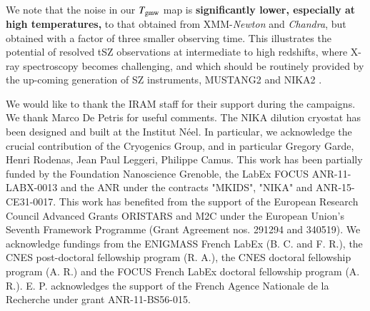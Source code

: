 \documentclass[twocolumn,traditabstract]{aa}
\begin{document}
We note that the noise in our $T_{\rm gmw}$ map is {\bf significantly lower, especially at high temperatures,} to that obtained from XMM-\textit{Newton} and \textit{Chandra}, but obtained with a factor of three smaller observing time. This illustrates the potential of resolved tSZ observations at intermediate to high redshifts, where X-ray spectroscopy becomes challenging, and which should be routinely provided by the up-coming generation of SZ instruments, MUSTANG2 \citep{Dicker2014} and NIKA2 \citep{Calvo2016,Comis2016}.

\begin{acknowledgements}
We would like to thank the IRAM staff for their support during the campaigns. 
We thank Marco De Petris for useful comments.
The NIKA dilution cryostat has been designed and built at the Institut N\'eel. In particular, we acknowledge the crucial contribution of the Cryogenics Group, and  in particular Gregory Garde, Henri Rodenas, Jean Paul Leggeri, Philippe Camus. 
This work has been partially funded by the Foundation Nanoscience Grenoble, the LabEx FOCUS ANR-11-LABX-0013 and the ANR under the contracts "MKIDS", "NIKA" and ANR-15-CE31-0017. 
This work has benefited from the support of the European Research Council Advanced Grants ORISTARS and M2C under the European Union's Seventh Framework Programme (Grant Agreement nos. 291294 and 340519).
We acknowledge fundings from the ENIGMASS French LabEx (B. C. and F. R.), the CNES post-doctoral fellowship program (R. A.),  the CNES doctoral fellowship program (A. R.) and the FOCUS French LabEx doctoral fellowship program (A. R.).
E. P. acknowledges the support of the French Agence Nationale de la Recherche under grant ANR-11-BS56-015.
\end{acknowledgements}


\end{document}
